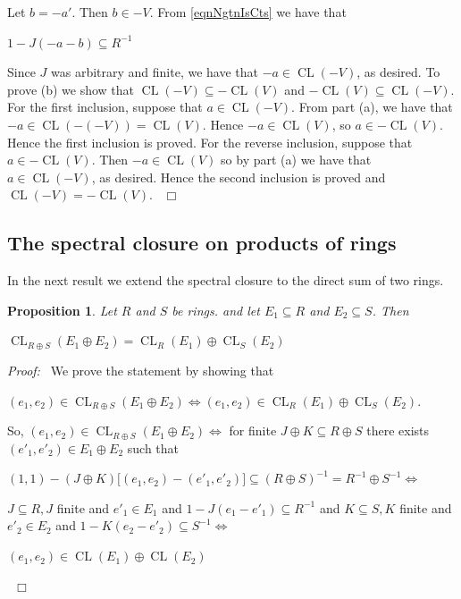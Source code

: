 \documentclass[12pt, oneside]{book}
\newtheorem{proposition}[theorem]{Proposition}
\newcommand{\proof}{{\noindent \it Proof:~}}
\newcommand{\qed}{\hfill ~$\Box$\\}
\def\CL{\operatorname{CL}}
\begin{document}
\vskip 0.3cm
\noindent Let $b=-a'$. Then $b \in -V$. From \eqref{eqnNgtnIsCts} we have that 
\begin{center}
$ 1-J(-a-b) \subseteq R^{-1}$
\end{center}
Since $J$ was arbitrary and finite, we have that $-a \in \CL(-V)$, as desired.
\vskip 0.3cm
\noindent To prove (b) we show that $\CL(-V) \subseteq - \CL(V)$ and $- \CL(V) \subseteq \CL(-V)$. 
For the first inclusion, suppose that $a \in \CL(-V)$. 
From part (a), we have that $-a \in \CL(-(-V)) = \CL(V)$. Hence $-a \in \CL(V)$, 
so $a \in -\CL(V)$. Hence the first inclusion is proved. For the reverse inclusion, suppose that $a \in - \CL(V)$. Then $-a \in \CL(V)$ so by part (a) we have that $a \in \CL(-V)$, as desired. Hence the second inclusion is proved and $\CL(-V)= - \CL(V)$. \qed

\subsection{The spectral closure on products of rings}

\noindent In the next result we extend the spectral closure to the direct sum of two 
rings.
\begin{proposition} \label{ClosureOfProducts}
\normalfont
Let $R$ and $S$ be rings. and let $E_1 \subseteq R$ and $E_2 \subseteq S$. Then 
\begin{center}
$\CL_{R\oplus S} (E_1 \oplus E_2) = \CL_R(E_1) \oplus \CL_S(E_2)$
\end{center}
\end{proposition}
\proof \space
We prove the statement by showing that
\begin{center}
$(e_1, e_2) \in \CL_{R\oplus S}(E_1 \oplus E_2) \iff (e_1, e_2) \in \CL_R(E_1) \oplus \CL_S(E_2).$
\end{center}
So, $(e_1, e_2) \in \CL_{R\oplus S}(E_1 \oplus E_2) \iff$
\vskip 0.3cm
for finite  $J \oplus K \subseteq R \oplus S$ there exists $(e'_1, e'_2) \in E_1 \oplus E_2$ such that\begin{center}
$(1, 1) - (J \oplus K) \big[(e_1, e_2) - (e'_1, e'_2)\big] \subseteq (R\oplus S)^{-1} = R^{-1} \oplus S^{-1} \iff $
\end{center}
$J \subseteq R, J$ finite and $e'_1 \in E_1$ and $1 - J(e_1 - e'_1) \subseteq R^{-1}$
\vskip 0.3cm
and
\vskip 0.3cm
\noindent $K \subseteq S, K$ finite and $e'_2 \in E_2$ and $1 - K(e_2 - e'_2) \subseteq S^{-1} \iff $
\begin{center}
$(e_1, e_2) \in \CL(E_1) \oplus \CL(E_2)$
\end{center}
\qed
\end{document}
